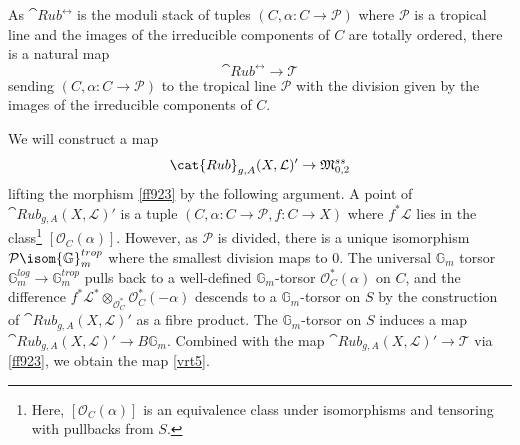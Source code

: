 \documentclass[a4paper,12pt]{article} %
\newcommand{\bb}[1]{{\mathbb{#1}}}
\newcommand{\cl}[1]{{\mathscr{#1}}}
\newcommand{\ca}[1]{{\mathcal{#1}}}
\theoremstyle{definition}
\theoremstyle{plain}%
\renewcommand{\phi}{\varphi}
\begin{document}
As $\cat{Rub}^{\rel}$ is the moduli stack of tuples $(C, \alpha\colon C \to \ca P)$ where $\ca P$ is a tropical line and the images of the irreducible components of $C$ are totally ordered, there is a natural map 
\begin{equation}\label{ff923}
\cat{Rub}^{\rel} \to \cl T
\end{equation}
sending $(C, \alpha\colon C \to \ca P)$ to the tropical line $\ca P$ with the division given by the images of the irreducible components of $C$. 


We will construct a map 
 \begin{equation}\label{vrt5}
 \cat{Rub}_{g,A}(X, \ca L)'\to \frak M_{0,2}^{ss}
 \end{equation}
 lifting the  morphism \eqref{ff923} by the following argument. 
A point of $\cat{Rub}_{g,A}(X, \ca L)'$ is a tuple $(C, \alpha\colon C \to \ca P, f\colon C \to X)$ where $f^*\ca L$ lies in the class{\footnote{Here,
$[\ca O_C(\alpha)]$
 is an equivalence class under isomorphisms and tensoring with pullbacks from $S$.
}}
$[\ca O_C(\alpha)]$.  However, as $\ca P$ is divided, there is a unique isomorphism $\ca P \isom \bb G_m^{trop}$ where the smallest division maps to $0$. The universal $\bb G_m$ torsor $\bb G_m^{log} \to \bb G_m^{trop}$ pulls back to a well-defined $\bb G_m$-torsor $\ca O_C^*(\alpha)$ on $C$, and the difference $f^*\ca L^* \otimes_{\ca O^*_C} \ca O^*_C(-\alpha)$ descends to a $\bb G_m$-torsor on $S$ by the construction of $\cat{Rub}_{g,A}(X, \ca L)'$ as a fibre product. The $\bb G_m$-torsor on $S$ induces a map $\cat{Rub}_{g,A}(X, \ca L)' \to B \bb G_m$. Combined with the map $\cat{Rub}_{g,A}(X, \ca L)' \to \cl T$ via \eqref{ff923},
we obtain the
map \eqref{vrt5}.


\end{document}
